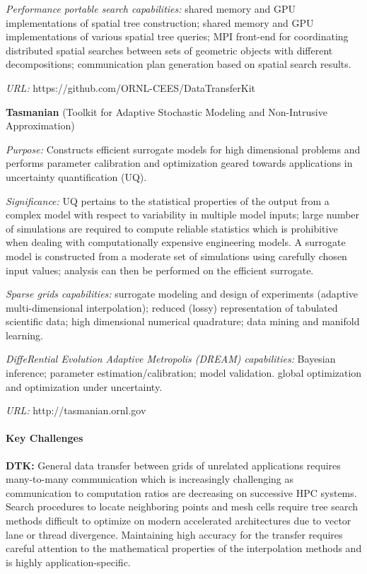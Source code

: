 {\it Performance portable search capabilities:} shared memory and GPU
implementations of spatial tree construction; shared memory and GPU
implementations of various spatial tree queries; MPI front-end for
coordinating distributed spatial searches between sets of geometric objects
with different decompositions; communication plan generation based on spatial
search results.

{\it URL:} https://github.com/ORNL-CEES/DataTransferKit


{\bf Tasmanian} (Toolkit for Adaptive Stochastic Modeling and Non-Intrusive
Approximation)

{\it Purpose:} Constructs efficient surrogate models for high dimensional
problems and performs parameter calibration and optimization geared towards
applications in uncertainty quantification (UQ).

{\it Significance:} UQ pertains to the statistical properties of the output
from a complex model with respect to variability in multiple model inputs;
large number of simulations are required to compute reliable statistics which
is prohibitive when dealing with computationally expensive engineering
models. A surrogate model is constructed from a moderate set of simulations
using carefully chosen input values; analysis can then be performed on the
efficient surrogate.

{\it Sparse grids capabilities:} surrogate modeling and design of experiments
(adaptive multi-dimensional interpolation); reduced (lossy) representation of
tabulated scientific data; high dimensional numerical quadrature; data mining
and manifold learning.

{\it DiffeRential Evolution Adaptive Metropolis (DREAM) capabilities:}
Bayesian inference; parameter estimation/calibration; model validation.
global optimization and optimization under uncertainty.

{\it URL:} http://tasmanian.ornl.gov

\paragraph{Key Challenges}

\indent

{\bf DTK:} General data transfer between grids of unrelated applications
requires many-to-many communication which is increasingly challenging as
communication to computation ratios are decreasing on successive HPC systems.
Search procedures to locate neighboring points and mesh cells require tree
search methods difficult to optimize on modern accelerated architectures due
to vector lane or thread divergence. Maintaining high accuracy for the
transfer requires careful attention to the mathematical properties of the
interpolation methods and is highly application-specific.

